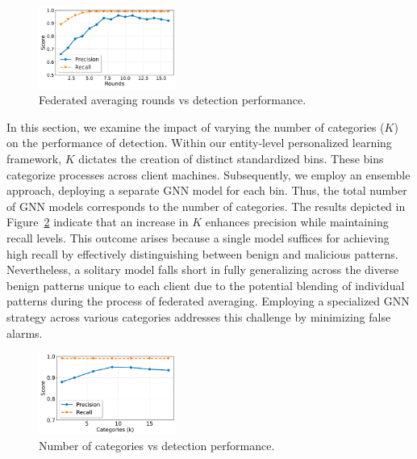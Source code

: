 \begin{figure}[t!]
  \centering
  \includegraphics[width=0.4\textwidth]{fig/roundsvsscore.pdf}
  \caption{Federated averaging rounds vs detection performance. }
  \label{roundsvsscore}
  \vspace{-2ex}
\end{figure}

 In this section, we examine the impact of varying the number of categories ($K$) on the performance of detection. Within our entity-level personalized \gnnshort learning framework, $K$ dictates the creation of distinct standardized bins. These bins categorize processes across client machines. Subsequently, we employ an ensemble approach, deploying a separate GNN model for each bin. Thus, the total number of GNN models corresponds to the number of categories. The results depicted in Figure~\ref{catgvsscore} indicate that an increase in $K$ enhances precision while maintaining recall levels. This outcome arises because a single model suffices for achieving high recall by effectively distinguishing between benign and malicious patterns. Nevertheless, a solitary model falls short in fully generalizing across the diverse benign patterns unique to each client due to the potential blending of individual patterns during the process of federated averaging. Employing a specialized GNN strategy across various categories addresses this challenge by minimizing false alarms.

\begin{figure}[t!]
  \centering
  \includegraphics[width=0.4\textwidth]{fig/kvsscore.pdf}
  \caption{Number of categories vs detection performance.}
  \label{catgvsscore}
  \vspace{-2ex}
\end{figure}

